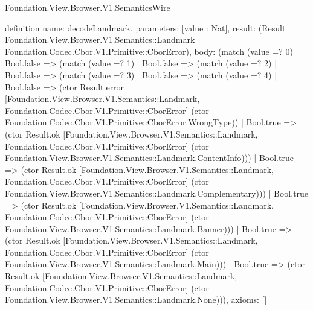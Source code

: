 \begin{lexlean}{Foundation.View.Browser.V1.SemanticsWire}
\begin{semanticmodule}
definition{
  name: decodeLandmark,
  parameters: [value : Nat],
  result: (Result Foundation.View.Browser.V1.Semantics::Landmark Foundation.Codec.Cbor.V1.Primitive::CborError),
  body: (match (value =? 0)
    | Bool.false => (match (value =? 1)
      | Bool.false => (match (value =? 2)
        | Bool.false => (match (value =? 3)
          | Bool.false => (match (value =? 4)
            | Bool.false => (ctor Result.error [Foundation.View.Browser.V1.Semantics::Landmark, Foundation.Codec.Cbor.V1.Primitive::CborError] (ctor Foundation.Codec.Cbor.V1.Primitive::CborError.WrongType))
            | Bool.true => (ctor Result.ok [Foundation.View.Browser.V1.Semantics::Landmark, Foundation.Codec.Cbor.V1.Primitive::CborError] (ctor Foundation.View.Browser.V1.Semantics::Landmark.ContentInfo)))
          | Bool.true => (ctor Result.ok [Foundation.View.Browser.V1.Semantics::Landmark, Foundation.Codec.Cbor.V1.Primitive::CborError] (ctor Foundation.View.Browser.V1.Semantics::Landmark.Complementary)))
        | Bool.true => (ctor Result.ok [Foundation.View.Browser.V1.Semantics::Landmark, Foundation.Codec.Cbor.V1.Primitive::CborError] (ctor Foundation.View.Browser.V1.Semantics::Landmark.Banner)))
      | Bool.true => (ctor Result.ok [Foundation.View.Browser.V1.Semantics::Landmark, Foundation.Codec.Cbor.V1.Primitive::CborError] (ctor Foundation.View.Browser.V1.Semantics::Landmark.Main)))
    | Bool.true => (ctor Result.ok [Foundation.View.Browser.V1.Semantics::Landmark, Foundation.Codec.Cbor.V1.Primitive::CborError] (ctor Foundation.View.Browser.V1.Semantics::Landmark.None))),
  axioms: []
}


\end{semanticmodule}
\end{lexlean}
